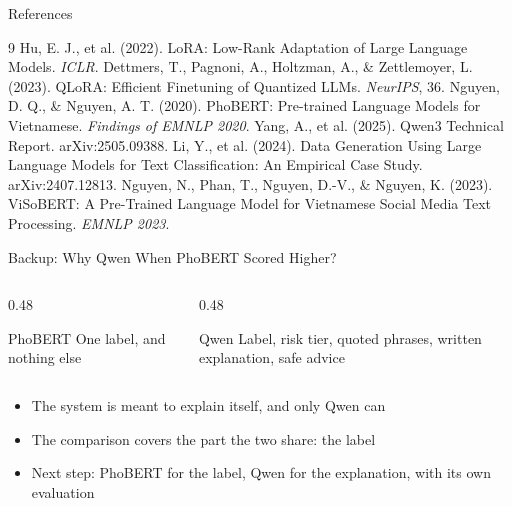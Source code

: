 \documentclass[aspectratio=169,12pt]{beamer}
\begin{document}
\begin{frame}{References}
  \footnotesize
  \begin{thebibliography}{9}
    Hu, E. J., et al. (2022). LoRA: Low-Rank Adaptation of Large Language Models. \textit{ICLR}.
    Dettmers, T., Pagnoni, A., Holtzman, A., \& Zettlemoyer, L. (2023). QLoRA: Efficient Finetuning of Quantized LLMs. \textit{NeurIPS}, 36.
    Nguyen, D. Q., \& Nguyen, A. T. (2020). PhoBERT: Pre-trained Language Models for Vietnamese. \textit{Findings of EMNLP 2020}.
    Yang, A., et al. (2025). Qwen3 Technical Report. arXiv:2505.09388.
    Li, Y., et al. (2024). Data Generation Using Large Language Models for Text Classification: An Empirical Case Study. arXiv:2407.12813.
    Nguyen, N., Phan, T., Nguyen, D.-V., \& Nguyen, K. (2023). ViSoBERT: A Pre-Trained Language Model for Vietnamese Social Media Text Processing. \textit{EMNLP 2023}.
  \end{thebibliography}
\end{frame}

\appendix

\begin{frame}{Backup: Why Qwen When PhoBERT Scored Higher?}
  \begin{columns}[T,onlytextwidth]
    \begin{column}{0.48\textwidth}
      \begin{block}{PhoBERT}
        \small One label, and nothing else
      \end{block}
    \end{column}
    \begin{column}{0.48\textwidth}
      \begin{block}{Qwen}
        \small Label, risk tier, quoted phrases, written explanation, safe advice
      \end{block}
    \end{column}
  \end{columns}
  \vspace{6pt}
  \begin{itemize}\itemsep 6pt\small
    \item The system is meant to explain itself, and only Qwen can
    \item The comparison covers the part the two share: the label
    \item Next step: PhoBERT for the label, Qwen for the explanation, with its own evaluation
  \end{itemize}
\end{frame}
\end{document}
